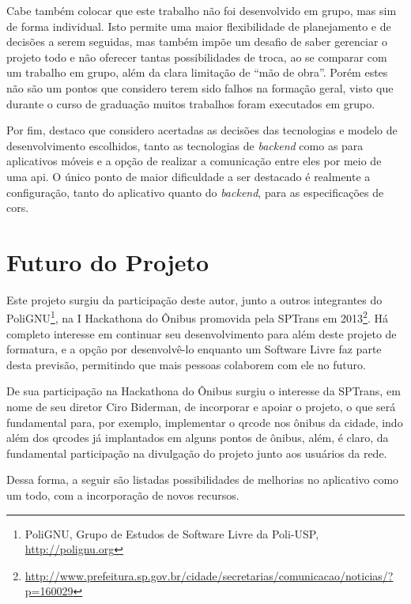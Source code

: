 Cabe também colocar que este trabalho não foi desenvolvido em grupo, mas sim de forma individual. Isto permite uma maior flexibilidade de planejamento e de decisões a serem seguidas, mas também impõe um desafio de saber gerenciar o projeto todo e não oferecer tantas possibilidades de troca, ao se comparar com um trabalho em grupo, além da clara limitação de ``mão de obra''. Porém estes não são um pontos que considero terem sido falhos na formação geral, visto que durante o curso de graduação muitos trabalhos foram executados em grupo.

Por fim, destaco que considero acertadas as decisões das tecnologias e modelo de desenvolvimento escolhidos, tanto as tecnologias de \textit{backend} como as para aplicativos móveis e a opção de realizar a comunicação entre eles por meio de uma \gls{api}. O único ponto de maior dificuldade a ser destacado é realmente a configuração, tanto do aplicativo quanto do \textit{backend}, para as especificações de \gls{cors}.

\section{Futuro do Projeto}\label{sec:futuro}
Este projeto surgiu da participação deste autor, junto a outros integrantes do PoliGNU\footnote{PoliGNU, Grupo de Estudos de Software Livre da Poli-USP, \url{http://polignu.org}}, na I Hackathona do Ônibus promovida pela SPTrans em 2013\footnote{\url{http://www.prefeitura.sp.gov.br/cidade/secretarias/comunicacao/noticias/?p=160029}}. Há completo interesse em continuar seu desenvolvimento para além deste projeto de formatura, e a opção por desenvolvê-lo enquanto um Software Livre faz parte desta previsão, permitindo que mais pessoas colaborem com ele no futuro.

De sua participação na Hackathona do Ônibus surgiu o interesse da SPTrans, em nome de seu diretor Ciro Biderman, de incorporar e apoiar o projeto, o que será fundamental para, por exemplo, implementar o \gls{qrcode} nos ônibus da cidade, indo além dos \gls{qrcode}s já implantados em alguns pontos de ônibus, além, é claro, da fundamental participação na divulgação do projeto junto aos usuários da rede.

Dessa forma, a seguir são listadas possibilidades de melhorias no aplicativo como um todo, com a incorporação de novos recursos.
